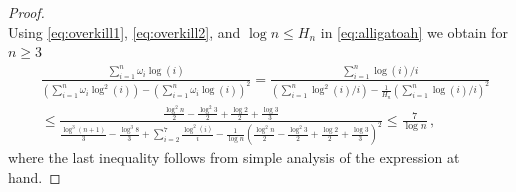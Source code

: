 \documentclass[10pt,a4paper]{amsart}
\begin{document}
\begin{proof}
\begin{equation}
    \end{equation}
    Using \eqref{eq:overkill1}, \eqref{eq:overkill2}, and $\log n\le H_n$ in \eqref{eq:alligatoah} we obtain for $n\ge 3$
    \begin{align*}
        &\frac{\sum_{i=1}^{n}\omega_i \log(i)}{(\sum_{i=1}^{n}\omega_i \log^2(i)) - (\sum_{i=1}^{n}\omega_i \log(i))^2}
        = \frac{\sum_{i=1}^{n}\log(i)/i}{(\sum_{i=1}^{n} \log^2(i)/i) - \frac{1}{H_n}(\sum_{i=1}^{n} \log(i)/i)^2} \\
        &\le \frac{\frac{\log^2 n}{2} - \frac{\log^2 3}{2} + \frac{\log 2}{2} + \frac{\log 3}{3}}{\frac{\log^3 (n+1)}{3} - \frac{\log^3 8}{3} + \sum_{i=2}^{7}\frac{\log^2 (i)}{i} - \frac{1}{\log n}(\frac{\log^2 n}{2} - \frac{\log^2 3}{2} + \frac{\log 2}{2} + \frac{\log 3}{3})^2}
        \le \frac{7}{\log n} \,,
    \end{align*}
    where the last inequality follows from simple analysis of the expression at hand.


\end{proof}
\end{document}
